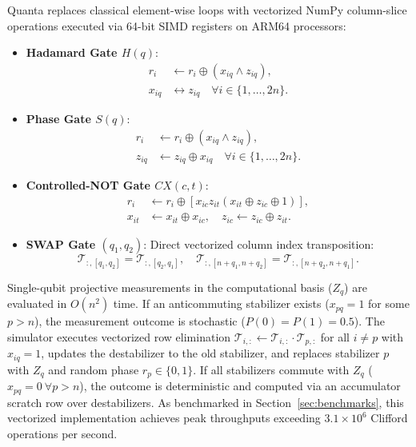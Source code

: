\documentclass[aps,prx,twocolumn,superscriptaddress,nofootinbib]{revtex4-2}
\begin{document}
Quanta replaces classical element-wise loops with vectorized NumPy column-slice operations executed via 64-bit SIMD registers on ARM64 processors:
\begin{itemize}
    \item \textbf{Hadamard Gate $H(q)$}:
    \begin{align}
        r_i &\leftarrow r_i \oplus (x_{iq} \land z_{iq}), \\
        x_{iq} &\leftrightarrow z_{iq} \quad \forall i \in \{1, \dots, 2n\}.
    \end{align}
    \item \textbf{Phase Gate $S(q)$}:
    \begin{align}
        r_i &\leftarrow r_i \oplus (x_{iq} \land z_{iq}), \\
        z_{iq} &\leftarrow z_{iq} \oplus x_{iq} \quad \forall i \in \{1, \dots, 2n\}.
    \end{align}
    \item \textbf{Controlled-NOT Gate $CX(c, t)$}:
    \begin{align}
        r_i &\leftarrow r_i \oplus \left[ x_{ic} z_{it} (x_{it} \oplus z_{ic} \oplus 1) \right], \\
        x_{it} &\leftarrow x_{it} \oplus x_{ic}, \quad z_{ic} \leftarrow z_{ic} \oplus z_{it}.
    \end{align}
    \item \textbf{SWAP Gate $(q_1, q_2)$}: Direct vectorized column index transposition:
    \begin{equation}
        \mathcal{T}_{:, [q_1, q_2]} = \mathcal{T}_{:, [q_2, q_1]}, \quad \mathcal{T}_{:, [n+q_1, n+q_2]} = \mathcal{T}_{:, [n+q_2, n+q_1]}.
    \end{equation}
\end{itemize}

Single-qubit projective measurements in the computational basis ($Z_q$) are evaluated in $O(n^2)$ time. If an anticommuting stabilizer exists ($x_{pq}=1$ for some $p > n$), the measurement outcome is stochastic ($P(0)=P(1)=0.5$). The simulator executes vectorized row elimination $\mathcal{T}_{i, :} \leftarrow \mathcal{T}_{i, :} \cdot \mathcal{T}_{p, :}$ for all $i \neq p$ with $x_{iq}=1$, updates the destabilizer to the old stabilizer, and replaces stabilizer $p$ with $Z_q$ and random phase $r_p \in \{0, 1\}$. If all stabilizers commute with $Z_q$ ($x_{pq}=0 \ \forall p > n$), the outcome is deterministic and computed via an accumulator scratch row over destabilizers. As benchmarked in Section~\ref{sec:benchmarks}, this vectorized implementation achieves peak throughputs exceeding $3.1 \times 10^6$ Clifford operations per second.
\end{document}

